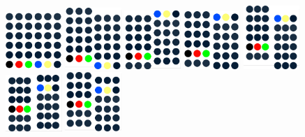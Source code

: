 \documentclass{article}
\begin{document}
\begin{figure}
  \includegraphics[width=0.19\textwidth]{graph3d_002.eps}
  \includegraphics[width=0.19\textwidth]{graph3d_003.eps}
  \includegraphics[width=0.19\textwidth]{graph3d_004.eps}
  \includegraphics[width=0.19\textwidth]{graph3d_005.eps}
  \includegraphics[width=0.19\textwidth]{graph3d_006.eps}
  \includegraphics[width=0.19\textwidth]{graph3d_007.eps}
  \includegraphics[width=0.19\textwidth]{graph3d_008.eps}

\end{figure}
\end{document}

